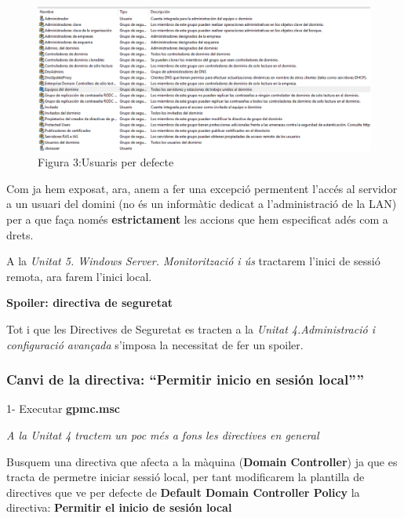 \documentclass[
  a4paper,
]{article}
\begin{document}
\begin{figure}
\centering
\includegraphics{png/usuarisDEfecteWS.png}
\caption{Figura 3:Usuaris per defecte}
\end{figure}

Com ja hem exposat, ara, anem a fer una excepció permentent l'accés al
servidor a un usuari del domini (no és un informàtic dedicat a
l'administració de la LAN) per a que faça només \textbf{estrictament}
les accions que hem especificat adés com a drets.

A la \emph{Unitat 5. Windows Server. Monitorització i ús} tractarem
l'inici de sessió remota, ara farem l'inici local.

\textbf{Spoiler: directiva de seguretat}

Tot i que les Directives de Seguretat es tracten a la \emph{Unitat
4.Administració i configuració avançada} s'imposa la necessitat de fer
un spoiler.

\subsubsection{\texorpdfstring{Canvi de la directiva: ``Permitir inicio
en sesión
local''''}{Canvi de la directiva: ``Permitir inicio en sesión local''\,''}}\label{canvi-de-la-directiva-permitir-inicio-en-sesiuxf3n-local}

1- Executar \textbf{gpmc.msc}

\emph{A la Unitat 4 tractem un poc més a fons les directives en general}

Busquem una directiva que afecta a la màquina (\textbf{Domain
Controller}) ja que es tracta de permetre iniciar sessió local, per tant
modificarem la plantilla de directives que ve per defecte de
\textbf{Default Domain Controller Policy} la directiva: \textbf{Permitir
el inicio de sesión local}
\end{document}
